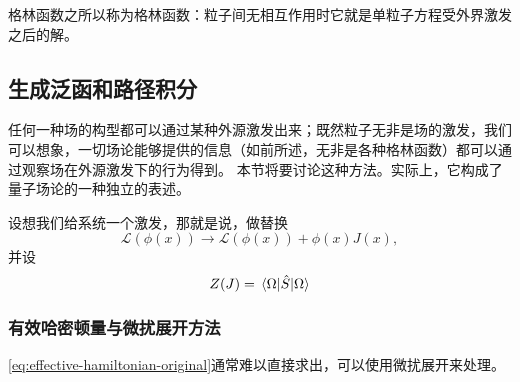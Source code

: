 \documentclass[hyperref, UTF8, a4paper]{ctexart}
\begin{document}
格林函数之所以称为格林函数：粒子间无相互作用时它就是单粒子方程受外界激发之后的解。

\subsection{生成泛函和路径积分}

任何一种场的构型都可以通过某种外源激发出来；既然粒子无非是场的激发，我们可以想象，一切场论能够提供的信息（如前所述，无非是各种格林函数）都可以通过观察场在外源激发下的行为得到。
本节将要讨论这种方法。实际上，它构成了量子场论的一种独立的表述。

设想我们给系统一个激发，那就是说，做替换
\begin{equation}
    \mathcal{L}(\phi(x)) \longrightarrow \mathcal{L}(\phi(x)) + \phi(x) J(x),
\end{equation}
并设
\begin{equation}
    Z(J) = \mel{\Omega}{\hat{S}}{\Omega}
\end{equation}


\subsubsection{有效哈密顿量与微扰展开方法}

\eqref{eq:effective-hamiltonian-original}通常难以直接求出，可以使用微扰展开来处理。
\end{document}

